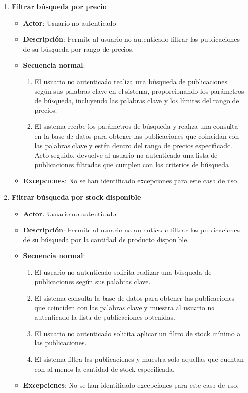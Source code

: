 \begin{enumerate}[label=UC-\protect\twodigits{\arabic*}:, align=left, leftmargin=*]
\item \textbf{Filtrar búsqueda por precio}
\begin{itemize}
\item \textbf{Actor}: Usuario no autenticado
\item \textbf{Descripción}: Permite al usuario no autenticado filtrar las publicaciones de su búsqueda por rango de precios.
\item \textbf{Secuencia normal}:
\begin{enumerate}[label={\arabic*}:]
\item El usuario no autenticado realiza una búsqueda de publicaciones según sus palabras clave en el sistema, proporcionando los parámetros de búsqueda, incluyendo las palabras clave y los límites del rango de precios.
\item El sistema recibe los parámetros de búsqueda y realiza una consulta en la base de datos para obtener las publicaciones que coincidan con las palabras clave y estén dentro del rango de precios especificado. Acto seguido, devuelve al usuario no autenticado una lista de publicaciones filtradas que cumplen con los criterios de búsqueda
\end{enumerate}
\item \textbf{Excepciones}: No se han identificado excepciones para este caso de uso.
\end{itemize}


\item \textbf{Filtrar búsqueda por stock disponible}
\begin{itemize}
\item \textbf{Actor}: Usuario no autenticado
\item \textbf{Descripción}: Permite al usuario no autenticado filtrar las publicaciones de su búsqueda por la cantidad de producto disponible.
\item \textbf{Secuencia normal}:
\begin{enumerate}[label={\arabic*}:]
\item El usuario no autenticado solicita realizar una búsqueda de publicaciones según sus palabras clave.
\item El sistema consulta la base de datos para obtener las publicaciones que coinciden con las palabras clave y muestra al usuario no autenticado la lista de publicaciones obtenidas.
\item El usuario no autenticado solicita aplicar un filtro de stock mínimo a las publicaciones.
\item El sistema filtra las publicaciones y muestra solo aquellas que cuentan con al menos la cantidad de stock especificada.
\end{enumerate}
\item \textbf{Excepciones}: No se han identificado excepciones para este caso de uso.
\end{itemize}


\end{enumerate}
